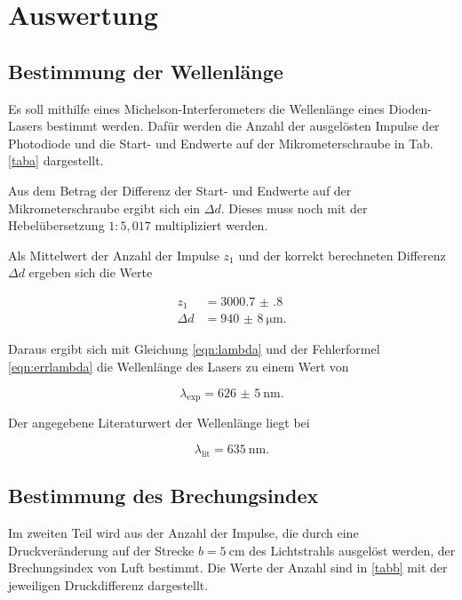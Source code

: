 \section{Auswertung}
\label{sec:Auswertung}

\subsection{Bestimmung der Wellenlänge}
Es soll mithilfe eines Michelson-Interferometers die Wellenlänge eines Dioden-Lasers bestimmt werden. 
Dafür werden die Anzahl der ausgelösten Impulse der Photodiode und die Start- und Endwerte auf der Mikrometerschraube in Tab. \ref{taba} dargestellt.  



\noindent Aus dem Betrag der Differenz der Start- und Endwerte auf der Mikrometerschraube ergibt sich ein $\Delta d$. Dieses muss noch mit der Hebelübersetzung $1:5,017$  multipliziert werden. 

\noindent Als Mittelwert der Anzahl der Impulse $z_1$ und der korrekt berechneten Differenz $\Delta d$ ergeben sich die Werte 

\begin{align*} 
   z_1 &= \num{3000.7(8)} \\
   \Delta d &= \SI{940(8)}{\micro\meter}.
\end{align*}

\noindent Daraus ergibt sich mit Gleichung \eqref{eqn:lambda} und der Fehlerformel \eqref{eqn:errlambda} die Wellenlänge des Lasers zu einem Wert von 

\begin{equation*}
    \lambda_\text{exp} = \SI{626(5)}{\nano\meter}.
\end{equation*}

\noindent Der angegebene Literaturwert der Wellenlänge liegt bei 

\begin{equation*}
    \lambda_\text{lit} = \SI{635}{\nano\meter}.
\end{equation*}

\subsection{Bestimmung des Brechungsindex}
Im zweiten Teil wird aus der Anzahl der Impulse, die durch eine Druckveränderung auf der Strecke $b = \SI{5}{\centi\meter}$ des Lichtstrahls ausgelöst werden, der Brechungsindex von Luft bestimmt. 
Die Werte der Anzahl sind in \ref{tabb} mit der jeweiligen Druckdifferenz dargestellt.

